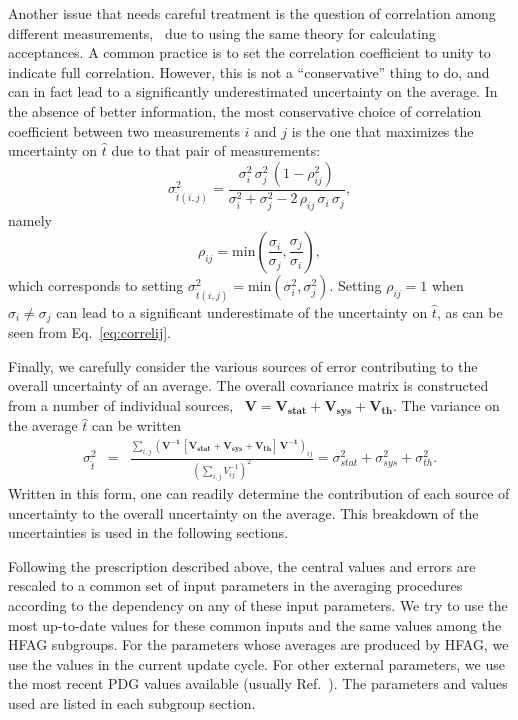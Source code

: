 
Another issue that needs careful treatment is the question of correlation
among different measurements, \eg\ due to using the same theory for
calculating acceptances.  A common practice is to set the correlation
coefficient to unity to indicate full correlation.  However, this is
not a ``conservative'' thing to do, and can in fact lead to a significantly
underestimated uncertainty on the average.  In the absence of
better information, the most conservative choice of correlation coefficient
between two measurements $i$ and $j$
is the one that maximizes the uncertainty on $\hat{t}$
due to that pair of measurements:
\begin{equation}
\sigma_{\hat{t}(i,j)}^2 = \frac{\sigma_i^2\,\sigma_j^2\,(1-\rho_{ij}^2)}
   {\sigma_i^2 + \sigma_j^2 - 2\,\rho_{ij}\,\sigma_i\,\sigma_j} ,
\label{eq:correlij}
\end{equation}
namely
\begin{equation}
\rho_{ij} = \mathrm{min}\left(\frac{\sigma_i}{\sigma_j},\frac{\sigma_j}{\sigma_i}\right) ,
\label{eq:correlrho}
\end{equation}
which corresponds to setting $\sigma_{\hat{t}(i,j)}^2=\mathrm{min}(\sigma_i^2,\sigma_j^2)$.
Setting $\rho_{ij}=1$ when $\sigma_i\ne\sigma_j$ can lead to a significant
underestimate of the uncertainty on $\hat{t}$, as can be seen
from Eq.~\ref{eq:correlij}.

Finally, we carefully consider the various sources of error
contributing to the overall uncertainty of an average.
The overall covariance matrix is constructed from a number of
individual sources, \eg\
$\mathbf{V} = \mathbf{V_{stat}+V_{sys}+V_{th}}$.
The variance on the average $\hat{t}$ can be written
\begin{eqnarray}
\sigma^2_{\hat{t}} 
 &=& 
\frac{ \sum_{i,j}\left(\mathbf{V^{-1}}\, 
\mathbf{[V_{stat}+V_{sys}+V_{th}]}\, \mathbf{V^{-1}}\right)_{ij}}
{\left(\sum_{i,j} V^{-1}_{ij}\right)^2}
= \sigma^2_{stat} + \sigma^2_{sys} + \sigma^2_{th} .
\end{eqnarray}
Written in this form, one can readily determine the 
contribution of each source of uncertainty to the overall uncertainty
on the average.  This breakdown of the uncertainties is used 
in the following sections.

Following the prescription described above, the central values and
errors are rescaled to a common set of input parameters in the averaging
procedures according to the dependency on any of these input parameters.
We try to use the most up-to-date values for these common inputs and 
the same values among the HFAG subgroups. For the parameters whose
averages are produced by HFAG, we use the values in the current 
update cycle.  For other external parameters, we use the most
recent PDG values available (usually Ref.~\cite{PDG_2014}). 
The parameters and values used are listed in each subgroup section.
